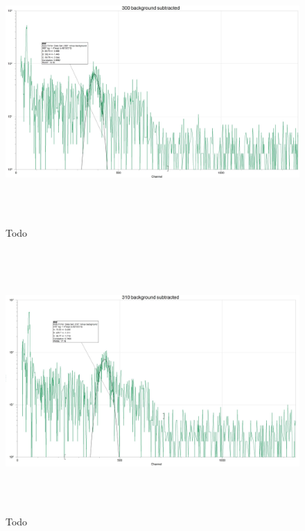 \documentclass[fleqn]{article}
\begin{document}
  \begin{figure}[htbp]
    \includegraphics[height=10cm, width=18cm]{Seven.JPG}
    \caption{
      Todo
    }
  \end{figure}

  \pagebreak

  \begin{figure}[htbp]
    \includegraphics[height=10cm, width=18cm]{Eight.JPG}
    \caption{
      Todo
    }
  \end{figure}

  \pagebreak
\end{document}
